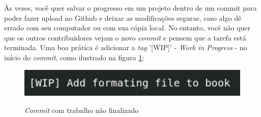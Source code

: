         Às vezes, você quer salvar o progresso em um projeto dentro de um commit para poder fazer upload no Github e deixar as modificações seguras, caso algo dê errado com seu computador ou com sua cópia local. No entanto, você não quer que os outros contribuidores vejam o novo \textit{commit} e pensem que a tarefa está terminada. Uma boa prática é adicionar a \textit{tag} '[WIP]' - \textit{Work in Progress} - no início do \textit{commit}, como ilustrado na figura \ref{figura:exemplo_tag}:
        \begin{figure}[H]
            \caption{\textit{Commit} com trabalho não finalizado}
            \vspace{0.5cm}
            \centering
            \includegraphics[width=12cm]{images/exemplo_tag.png}
            \label{figura:exemplo_tag}
        \end{figure}
